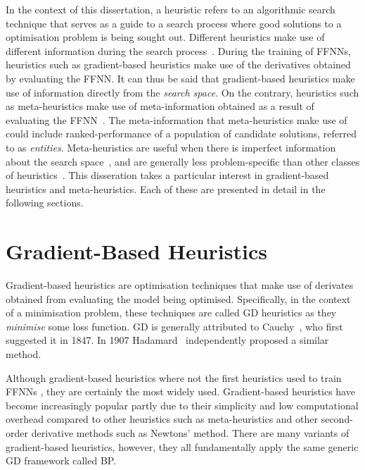 In the context of this dissertation, a heuristic refers to an algorithmic search technique that serves as a guide to a search process where good solutions to a optimisation problem is being sought out. Different heuristics make use of different information during the search process~\cite{ref:kheiri:2017}. During the training of \acp{FFNN}, heuristics such as gradient-based heuristics make use of the derivatives obtained by evaluating the \acs{FFNN}. It can thus be said that gradient-based heuristics make use of information directly from the \textit{search space}. On the contrary, heuristics such as meta-heuristics make use of meta-information obtained as a result of evaluating the \acs{FFNN}~\cite{ref:blum:2003}. The meta-information that meta-heuristics make use of could include ranked-performance of a population of candidate solutions, referred to as \textit{entities}. Meta-heuristics are useful when there is imperfect information about the search space~\cite{ref:bianchi:2009}, and are generally less problem-specific than other classes of heuristics~\cite{ref:blum:2003}. This disseration takes a particular interest in gradient-based heuristics and meta-heuristics. Each of these are presented in detail in the following sections.


\section{Gradient-Based Heuristics}\label{sec:heuristics:gd}

Gradient-based heuristics are optimisation techniques that make use of derivates obtained from evaluating the model being optimised. Specifically, in the context of a minimisation problem, these techniques are called \acf{GD} heuristics as they \textit{minimise} some loss function. \Acs{GD} is generally attributed to Cauchy~\cite{ref:lemarechal:2012}, who first suggested it in 1847. In 1907 Hadamard~\cite{ref:hadamard:1908} independently proposed a similar method.

Although gradient-based heuristics where not the first heuristics used to train \acp{FFNN}
\cite{ref:engelbrecht:2007}, they are certainly the most widely used. Gradient-based heuristics have become increasingly popular partly due to their simplicity and low computational overhead compared to other heuristics such as meta-heuristics and other second-order derivative methods such as Newtons' method. There are many variants of gradient-based heuristics, however, they all fundamentally apply the same generic \acs{GD} framework called \acf{BP}.

